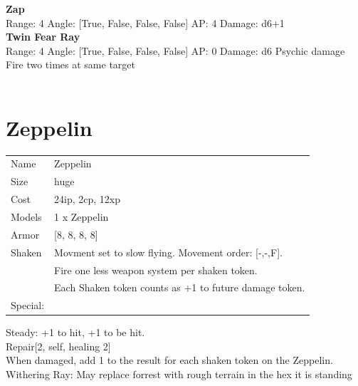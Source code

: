 {\bf Zap } \\



Range: 4  Angle: [True, False, False, False] AP: 4 Damage: d6+1 \\




{\bf Twin Fear Ray } \\



Range: 4  Angle: [True, False, False, False] AP: 0 Damage: d6 Psychic damage \\
Fire two times at same target\\ 




 
\ \\













\clearpage

\section{ Zeppelin }

\begin{tabular}{ll}
  Name & Zeppelin \\
  Size & huge\\
  Cost & 24ip, 2cp, 12xp\\
  Models & 1 x Zeppelin\\
  Armor & [8, 8, 8, 8]\\
  Shaken & Movment set to slow flying. Movement order: [-,-,F]. \ \\ &Fire one less weapon system per shaken token. \ \\ &Each Shaken token counts as +1 to future damage token.\\
  Special: \\
\end{tabular}

\noindent Steady: +1 to hit, +1 to be hit.\\ 
Repair[2, self, healing 2]\\ 
 When damaged, add 1 to the result for each shaken token on the Zeppelin.\\ 
Withering Ray: May replace forrest with rough terrain in the hex it is standing\\ 


